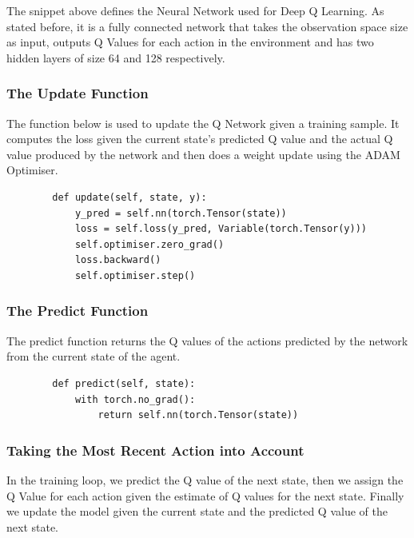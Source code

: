 \documentclass{article}
\begin{document}
The snippet above defines the Neural Network used for Deep Q Learning. As stated before, it is a fully connected network that takes the observation space size as input, outputs Q Values for each action in the environment and has two hidden layers of size 64 and 128 respectively. 


\subsubsection{The Update Function}


The function below is used to update the Q Network given a training sample. It computes the loss given the current state's predicted Q value and the actual Q value produced by the network and then does a weight update using the ADAM Optimiser. 


\begin{verbatim}
        def update(self, state, y):
            y_pred = self.nn(torch.Tensor(state))
            loss = self.loss(y_pred, Variable(torch.Tensor(y)))
            self.optimiser.zero_grad()
            loss.backward()
            self.optimiser.step()
\end{verbatim}

\subsubsection{The Predict Function}

The predict function returns the Q values of the actions predicted by the network from the current state of the agent.

\begin{verbatim}
        def predict(self, state):
            with torch.no_grad():
                return self.nn(torch.Tensor(state))
\end{verbatim}


\subsubsection{Taking the Most Recent Action into Account}

In the training loop, we predict the Q value of the next state, then we assign the Q Value for each action given the estimate of Q values for the next state. Finally we update the model given the current state and the predicted Q value of the next state.
\end{document}

